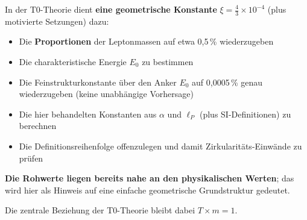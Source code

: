 	\begin{tcolorbox}[colback=green!10!white,colframe=green!75!black,title=Zusammenfassende Einordnung]
		In der T0-Theorie dient \textbf{eine geometrische Konstante} $\xi = \frac{4}{3} \times 10^{-4}$ (plus motivierte Setzungen) dazu:
		
		\begin{itemize}
			\item Die \textbf{Proportionen} der Leptonmassen auf etwa 0,5\,\% wiederzugeben
			\item Die charakteristische Energie $E_0$ zu bestimmen  
			\item Die Feinstrukturkonstante über den Anker $E_0$ auf 0,0005\,\% genau wiederzugeben (keine unabhängige Vorhersage)
			\item Die hier behandelten Konstanten aus $\alpha$ und $\ell_P$ (plus SI-Definitionen) zu berechnen
			\item Die Definitionsreihenfolge offenzulegen und damit Zirkularitäts-Einwände zu prüfen
		\end{itemize}
		
		\textbf{Die Rohwerte liegen bereits nahe an den physikalischen Werten}; das wird hier als Hinweis auf eine einfache geometrische Grundstruktur gedeutet.
		
		\vspace{0.5cm}
		Die zentrale Beziehung der T0-Theorie bleibt dabei $T \times m = 1$.
	\end{tcolorbox}
	